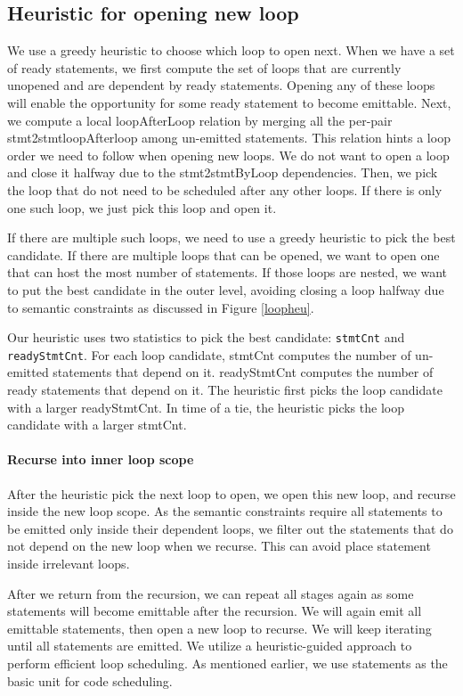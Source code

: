 \documentclass[sigplan, nonacm]{acmart}\settopmatter{printfolios=true,printccs=false,printacmref=false}
\begin{document}
\subsection*{Heuristic for opening new loop}
We use a greedy heuristic to choose which loop to open next. When we have a set of ready statements, we first compute the set of loops that are currently unopened and are dependent by ready statements. Opening any of these loops will enable the opportunity for some ready statement to become emittable. Next, we compute a local loopAfterLoop relation by merging all the per-pair stmt2stmtloopAfterloop among un-emitted statements. This relation hints a loop order we need to follow when opening new loops. We do not want to open a loop and close it halfway due to the stmt2stmtByLoop dependencies. Then, we pick the loop that do not need to be scheduled after any other loops. If there is only one such loop, we just pick this loop and open it. \par
If there are multiple such loops, we need to use a greedy heuristic to pick the best candidate. If there are multiple loops that can be opened, we want to open one that can host the most number of statements. If those loops are nested, we want to put the best candidate in the outer level, avoiding closing a loop halfway due to semantic constraints as discussed in Figure \ref{loopheu}.\par
Our heuristic uses two statistics to pick the best candidate: \texttt{stmtCnt} and \texttt{readyStmtCnt}. For each loop candidate, stmtCnt computes the number of un-emitted statements that depend on it. readyStmtCnt computes the number of ready statements that depend on it. The heuristic first picks the loop candidate with a larger readyStmtCnt. In time of a tie, the heuristic picks the loop candidate with a larger stmtCnt.\par
\paragraph*{Recurse into inner loop scope} After the heuristic pick the next loop to open, we open this new loop, and recurse inside the new loop scope. As the semantic constraints require all statements to be emitted only inside their dependent loops, we filter out the statements that do not depend on the new loop when we recurse. This can avoid place statement inside irrelevant loops.\par
After we return from the recursion, we can repeat all stages again as some statements will become emittable after the recursion. We will again emit all emittable statements, then open a new loop to recurse. We will keep iterating until all statements are emitted.
\fi
We utilize a heuristic-guided approach to perform efficient loop scheduling. As mentioned earlier, we use statements as the basic unit for code scheduling.
\end{document}
